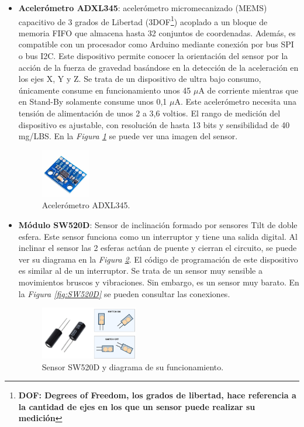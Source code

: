 \begin{itemize}
    \item \textbf{Acelerómetro ADXL345}\cite{ADXL345}: acelerómetro micromecanizado (MEMS) capacitivo de 3 grados de Libertad (3DOF\footnote{\textbf{DOF: Degrees of Freedom, los grados de libertad, hace referencia a la cantidad de ejes en los que un sensor puede realizar su medición}}) acoplado a un bloque de memoria FIFO que almacena hasta 32 conjuntos de coordenadas. Además, es compatible con un procesador como Arduino mediante conexión por bus SPI o bus I2C. Este dispositivo permite conocer la orientación del sensor por la acción de la fuerza de gravedad basándose en la detección de la aceleración en los ejes X, Y y Z. Se trata de un dispositivo de ultra bajo consumo, únicamente consume en funcionamiento unos 45 $\mu$A de corriente mientras que en Stand-By solamente consume unos 0,1 $\mu$A. Este acelerómetro necesita una tensión de alimentación de unos 2 a 3,6 voltios. El rango de medición del dispositivo es ajustable, con resolución de hasta 13 bits y sensibilidad de 40 mg/LBS. En la \textit{Figura \ref{fig:ADXL345}} se puede ver una imagen del sensor.
\begin{figure}[h!]
    \centering
    \includegraphics[width=0.2\textwidth]{img/ADXL345.jpeg}
    \caption{Acelerómetro ADXL345\cite{imgADXL345}.}
    \label{fig:ADXL345} 
\end{figure}

    \item \textbf{Módulo SW520D}\cite{SW520D_1}: Sensor de inclinación formado por sensores Tilt de doble esfera. Este sensor funciona como un interruptor y tiene una salida digital. Al inclinar el sensor las 2 esferas actúan de puente y cierran el circuito, se puede ver su diagrama en la \textit{Figura \ref{fig:imgSW520D}}. El código de programación de este dispositivo es similar al de un interruptor. Se trata de un sensor muy sensible a movimientos bruscos y vibraciones. Sin embargo, es un sensor muy barato. En la \textit{Figura \ref{fig:SW520D}} se pueden consultar las conexiones.
\begin{figure}[h!]
    \centering
    \includegraphics[width=0.4\textwidth]{img/imgSW520D_diag.png}
    \caption{Sensor SW520D\cite{imgSW520D} y diagrama de su funcionamiento.}
    \label{fig:imgSW520D} 
\end{figure}


\end{itemize}
